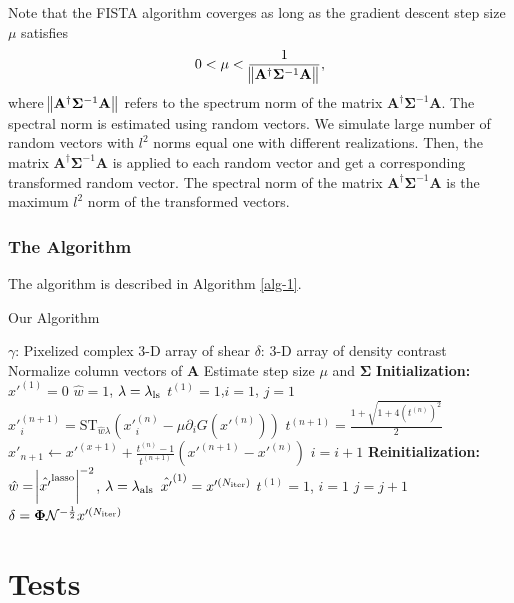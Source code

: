 \documentclass[twocolumn]{aastex62}
\begin{document}
Note that the FISTA algorithm coverges as long as the gradient descent step size $\mu$ satisfies
\begin{equation}
 0< \mu < \frac{1}{ \norm{\mathbf{A^{\dagger}} \mathbf{\Sigma}^{-1} \mathbf{A} }},
\end{equation}
where $\norm{\mathbf{A^{\dagger}} \mathbf{\Sigma}^{-1} \mathbf{A} }$ refers to the spectrum norm of the matrix
$\mathbf{A^{\dagger}} \mathbf{\Sigma}^{-1} \mathbf{A}$. The spectral norm is estimated using random
vectors. We simulate large number of random vectors with $l^2$ norms equal one with different realizations. Then, 
the matrix $\mathbf{A^{\dagger}} \mathbf{\Sigma}^{-1} \mathbf{A}$ is applied to each random vector and get a 
corresponding transformed random vector. The spectral norm of the matrix $\mathbf{A^{\dagger}} \mathbf{\Sigma}^{-1} \mathbf{A}$
is the maximum $l^2$ norm of the transformed vectors.


\subsubsection{The Algorithm}
The algorithm is described in Algorithm \ref{alg-1}.

\begin{algorithm}[H]
\renewcommand{\thealgorithm}{}
\label{alg-1}
\caption{Our Algorithm}
\begin{algorithmic}[1]
\INPUT $\gamma$: Pixelized complex $3$-D array of shear
\OUTPUT  $\delta$: $3$-D array of density contrast
\STATE Normalize column vectors of $\mathbf{A}$
\STATE Estimate step size $\mu$ and $\mathbf{\Sigma}$
\STATE \textbf{Initialization:} ‎
\STATE $x'^{(1)} = 0$ 
\STATE $\hat{w}=1$, $\lambda=\lambda_{\rm{ls}}$
\STATE $t^{(1)}=1$,$i=1$, $j=1$
        \STATE $x'^{(n+1)}_{i}=\mathrm{ST}_{\hat{w}\lambda} \left(x'^{(n)}_{i} -\mu \partial_i G(x'^{(n)})\right)$
        \STATE $t^{(n+1)}=\frac{1+\sqrt{1+4(t^{(n)})^2}}{2}$
        \STATE $x'_{n+1} \leftarrow x'^{(x+1)}+ \frac{t^{(n)}-1}{t^{(n+1)}}(x'^{(n+1)}-x'^{(n)})$
        \STATE $i=i+1$
    \ENDWHILE
\STATE \textbf{Reinitialization:} ‎
\STATE $\hat{w}=\abs{\hat{x'}^{\rm{lasso}}}^{-2}$, $\lambda=\lambda_{\rm{als}}$
\STATE $\hat{x'}^{(1)} = x'^{(N_{\rm{iter}})}$
\STATE $t^{(1)}=1$, $i=1$
\STATE $j=j+1$
\ENDWHILE
\STATE $\delta=\mathbf{\Phi}\mathcal{N}^{-\frac{1}{2}}x'^{(N_{\rm{iter}})}$
\end{algorithmic}
\end{algorithm}


\section{Tests}
\label{sec:Test}
\end{document}
